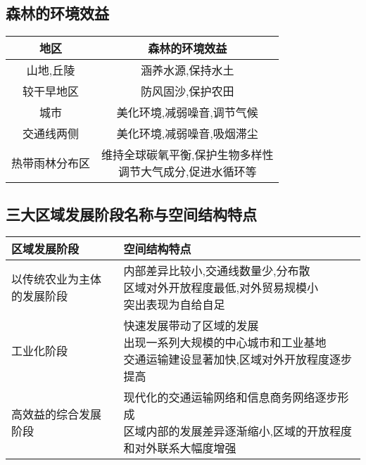 \documentclass[a4paper]{article}
\begin{document}
    \subsection{森林的环境效益}
        \begin{tabular}{|c|c|}
            \hline
            地区    &   森林的环境效益  \\
            \hline
            山地,丘陵  &   涵养水源,保持水土  \\
            \hline
            较干早地区  &   防风固沙,保护农田  \\
            \hline
            城市    &   美化环境,减弱噪音,调节气候    \\
            \hline
            交通线两侧  &   美化环境,减弱噪音,吸烟滞尘    \\
            \hline
            热带雨林分布区  &   \makecell[c]{维持全球碳氧平衡,保护生物多样性\\调节大气成分,促进水循环等} \\
            \hline
        \end{tabular}
    \subsection{三大区域发展阶段名称与空间结构特点}
        \begin{tabular}{|p{20mm}|l|}
            \hline
            区域发展阶段    &   空间结构特点    \\
            \hline
            以传统农业为主体的发展阶段  &   \makecell[l]{内部差异比较小,交通线数量少,分布散 \\ 区域对外开放程度最低,对外贸易规模小 \\ 突出表现为自给自足}  \\
            \hline
            工业化阶段  &  \makecell[l]{快速发展带动了区域的发展 \\ 出现一系列大规模的中心城市和工业基地 \\ 交通运输建设显著加快,区域对外开放程度逐步提高} \\
            \hline
            高效益的综合发展阶段    &   \makecell[l]{现代化的交通运输网络和信息商务网络逐步形成 \\ 区域内部的发展差异逐渐缩小,区域的开放程度和对外联系大幅度增强}    \\
            \hline
        \end{tabular}
\end{document}
